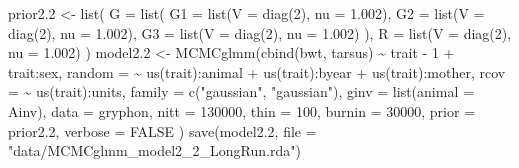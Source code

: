 \documentclass[
  12pt,
]{book}
\newenvironment{Shaded}{\begin{snugshade}}{\end{snugshade}}
\newcommand{\AttributeTok}[1]{\textcolor[rgb]{0.77,0.63,0.00}{#1}}
\newcommand{\ConstantTok}[1]{\textcolor[rgb]{0.00,0.00,0.00}{#1}}
\newcommand{\DecValTok}[1]{\textcolor[rgb]{0.00,0.00,0.81}{#1}}
\newcommand{\FloatTok}[1]{\textcolor[rgb]{0.00,0.00,0.81}{#1}}
\newcommand{\FunctionTok}[1]{\textcolor[rgb]{0.00,0.00,0.00}{#1}}
\newcommand{\NormalTok}[1]{#1}
\newcommand{\OtherTok}[1]{\textcolor[rgb]{0.56,0.35,0.01}{#1}}
\newcommand{\SpecialCharTok}[1]{\textcolor[rgb]{0.00,0.00,0.00}{#1}}
\newcommand{\StringTok}[1]{\textcolor[rgb]{0.31,0.60,0.02}{#1}}
\begin{document}
\begin{Shaded}
\begin{Highlighting}[]
\NormalTok{prior2}\FloatTok{.2} \OtherTok{\textless{}{-}} \FunctionTok{list}\NormalTok{(}
  \AttributeTok{G =} \FunctionTok{list}\NormalTok{(}
    \AttributeTok{G1 =} \FunctionTok{list}\NormalTok{(}\AttributeTok{V =} \FunctionTok{diag}\NormalTok{(}\DecValTok{2}\NormalTok{), }\AttributeTok{nu =} \FloatTok{1.002}\NormalTok{),}
    \AttributeTok{G2 =} \FunctionTok{list}\NormalTok{(}\AttributeTok{V =} \FunctionTok{diag}\NormalTok{(}\DecValTok{2}\NormalTok{), }\AttributeTok{nu =} \FloatTok{1.002}\NormalTok{),}
    \AttributeTok{G3 =} \FunctionTok{list}\NormalTok{(}\AttributeTok{V =} \FunctionTok{diag}\NormalTok{(}\DecValTok{2}\NormalTok{), }\AttributeTok{nu =} \FloatTok{1.002}\NormalTok{)}
\NormalTok{  ),}
  \AttributeTok{R =} \FunctionTok{list}\NormalTok{(}\AttributeTok{V =} \FunctionTok{diag}\NormalTok{(}\DecValTok{2}\NormalTok{), }\AttributeTok{nu =} \FloatTok{1.002}\NormalTok{)}
\NormalTok{)}
\NormalTok{model2}\FloatTok{.2} \OtherTok{\textless{}{-}} \FunctionTok{MCMCglmm}\NormalTok{(}\FunctionTok{cbind}\NormalTok{(bwt, tarsus) }\SpecialCharTok{\textasciitilde{}}\NormalTok{ trait }\SpecialCharTok{{-}} \DecValTok{1} \SpecialCharTok{+}\NormalTok{ trait}\SpecialCharTok{:}\NormalTok{sex,}
  \AttributeTok{random =} \SpecialCharTok{\textasciitilde{}} \FunctionTok{us}\NormalTok{(trait)}\SpecialCharTok{:}\NormalTok{animal }\SpecialCharTok{+} \FunctionTok{us}\NormalTok{(trait)}\SpecialCharTok{:}\NormalTok{byear }\SpecialCharTok{+} \FunctionTok{us}\NormalTok{(trait)}\SpecialCharTok{:}\NormalTok{mother,}
  \AttributeTok{rcov =} \SpecialCharTok{\textasciitilde{}} \FunctionTok{us}\NormalTok{(trait)}\SpecialCharTok{:}\NormalTok{units,}
  \AttributeTok{family =} \FunctionTok{c}\NormalTok{(}\StringTok{"gaussian"}\NormalTok{, }\StringTok{"gaussian"}\NormalTok{),}
  \AttributeTok{ginv =} \FunctionTok{list}\NormalTok{(}\AttributeTok{animal =}\NormalTok{ Ainv), }\AttributeTok{data =}\NormalTok{ gryphon,}
  \AttributeTok{nitt =} \DecValTok{130000}\NormalTok{, }\AttributeTok{thin =} \DecValTok{100}\NormalTok{, }\AttributeTok{burnin =} \DecValTok{30000}\NormalTok{,}
  \AttributeTok{prior =}\NormalTok{ prior2}\FloatTok{.2}\NormalTok{, }\AttributeTok{verbose =} \ConstantTok{FALSE}
\NormalTok{)}
\FunctionTok{save}\NormalTok{(model2}\FloatTok{.2}\NormalTok{, }\AttributeTok{file =} \StringTok{"data/MCMCglmm\_model2\_2\_LongRun.rda"}\NormalTok{)}
\end{Highlighting}
\end{Shaded}
\end{document}
